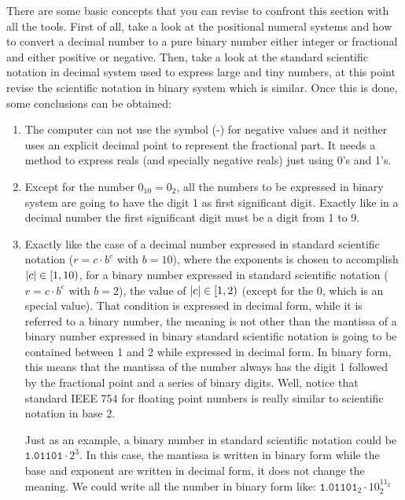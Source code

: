 \begin{IN}
    There are some basic concepts that you can revise to confront this section with all the tools. First of all, take a look at the positional numeral systems and how to convert a decimal number to a pure binary number either integer or fractional and either positive or negative. Then, take a look at the standard scientific notation in decimal system used to express large and tiny numbers, at this point revise the scientific notation in binary system which is similar. Once this is done, some conclusions can be obtained:
    \begin{enumerate}
        \item The computer can not use the symbol (-) for negative values and it neither uses an explicit decimal point to represent the fractional part. It needs a method to express reals (and specially negative reals) just using 0's and 1's.
        \item Except for the number $0_{10} = 0_{2}$, all the numbers to be expressed in binary system are going to have the digit 1 as first significant digit. Exactly like in a decimal number the first significant digit must be a digit from 1 to 9. 
        \item Exactly like the case of a decimal number expressed in standard scientific notation ($r=c\cdot b^e$ with $b=10$), where the exponents is chosen to accomplish $\abs{c}\in\left[ 1,10\right)$, for a binary number expressed in standard scientific notation ($r=c\cdot b^e$ with $b=2$), the value of $\abs{c}\in\left[ 1,2\right)$ (except for the 0, which is an special value). That condition is expressed in decimal form, while it is referred to a binary number, the meaning is not other than the mantissa of a binary number expressed in binary standard scientific notation is going to be contained  between 1 and 2 while expressed in decimal form. In binary form, this means that the mantissa of the number always has the digit 1 followed by the fractional point and a series of binary digits. Well, notice that standard IEEE 754 for floating point numbers is really similar to scientific notation in base 2. 
        
        Just as an example, a binary number in standard scientific notation could be $\texttt{1.01101}\cdot2^{3}$. In this case, the mantissa is written in binary form while the base and exponent are written in decimal form, it does not change the meaning. We could write all the number in binary form like: $\texttt{1.01101}_2 \cdot 10_2^{11_2}$
    \end{enumerate}
\end{IN}     











